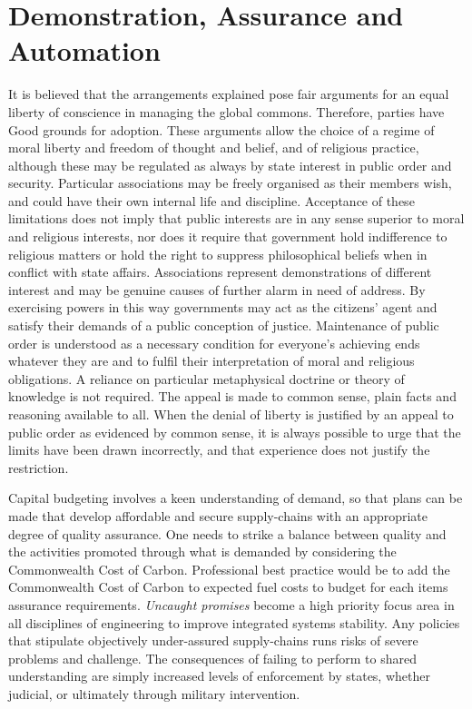 \documentclass[11pt, oneside]{book}   	%
\begin{document}
\section{Demonstration, Assurance and Automation}
It is believed that the arrangements explained pose fair arguments for an equal liberty of conscience in managing the global commons.
Therefore, parties have Good grounds for adoption.
These arguments allow the choice of a regime of moral liberty and freedom of thought and belief, and of religious practice, although these may be regulated as always by state interest in public order and security.
Particular associations may be freely organised as their members wish, and could have their own internal life and discipline.
Acceptance of these limitations does not imply that public interests are in any sense superior to moral and religious interests, nor does it require that government hold indifference to religious matters or hold the right to suppress philosophical beliefs when in conflict with state affairs.
Associations represent demonstrations of different interest and may be genuine causes of further alarm in need of address.
By exercising powers in this way governments may act as the citizens' agent and satisfy their demands of a public conception of justice.
Maintenance of public order is understood as a necessary condition for everyone's achieving ends whatever they are and to fulfil their interpretation of moral and religious obligations.
A reliance on particular metaphysical doctrine or theory of knowledge is not required.
The appeal is made to common sense, plain facts and reasoning available to all.
When the denial of liberty is justified by an appeal to public order as evidenced by common sense, it is always possible to urge that the limits have been drawn incorrectly, and that experience does not justify the restriction.\

Capital budgeting involves a keen understanding of demand, so that plans can be made that develop affordable and secure supply-chains with an appropriate degree of quality assurance.
One needs to strike a balance between quality and the activities promoted through what is demanded by considering the Commonwealth Cost of Carbon.
Professional best practice would be to add the Commonwealth Cost of Carbon to expected fuel costs to budget for each items assurance requirements.
\emph{Uncaught promises} become a high priority focus area in all disciplines of engineering to improve integrated systems stability.
Any policies that stipulate objectively under-assured supply-chains runs risks of severe problems and challenge.
The consequences of failing to perform to shared understanding are simply increased levels of enforcement by states, whether judicial, or ultimately through military intervention.\
\end{document}
